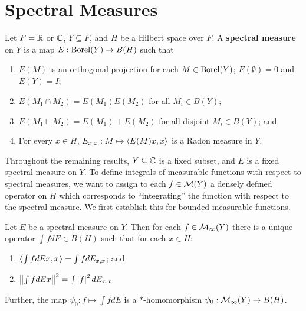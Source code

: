 \documentclass[10pt]{amsart}
\begin{document}



\section{Spectral Measures}
\begin{definition}
    Let $F = \mathbb{R}$ or $\mathbb{C}$, $Y \subseteq F$, and $H$ be a Hilbert space over $F$. A \textbf{spectral measure} on $Y$ is a map $E : \operatorname{Borel}(Y) \to B(H)$ such that
    \begin{enumerate}
        \item $E(M)$ is an orthogonal projection for each $M \in \operatorname{Borel}(Y)$; $E(\emptyset) = 0$ and $E(Y) = I$;
        \item $E(M_1 \cap M_2) = E(M_1)E(M_2)$ for all $M_i \in B(Y)$;
        \item $E(M_1 \sqcup M_2) = E(M_1) + E(M_2)$ for all disjoint $M_i \in B(Y)$; and
        \item For every $x \in H$, $E_{x, x} : M \mapsto \left\langle E(M)x, x \right\rangle$ is a Radon measure in $Y$.
    \end{enumerate}
\end{definition}
Throughout the remaining results, $Y \subseteq \mathbb{C}$ is a fixed subset, and $E$ is a fixed spectral measure on $Y$. To define integrals of measurable functions with respect to spectral measures, we want to assign to each $f \in \mathcal{M}(Y)$ a densely defined operator on $H$ which corresponds to ``integrating'' the function with respect to the spectral measure. We first establish this for bounded measurable functions.
\begin{lemma}\label{bdint}
    Let $E$ be a spectral measure on $Y$. Then for each $f \in \mathcal{M}_\infty(Y)$ there is a unique operator $\int f dE \in B(H)$ such that for each $x \in H$:
    \begin{enumerate}
        \item $\left\langle \int f dEx, x \right\rangle = \int f dE_{x, x}$; and
        \item $\left\| \int f dE x \right\|^2 = \int\left| f \right|^2 dE_{x, x}$
    \end{enumerate}
    Further, the map $\psi_0 : f \mapsto \int f dE$ is a $*$-homomorphism $\psi_0 : \mathcal{M}_\infty(Y) \to B(H)$.
\end{lemma}
\end{document}
